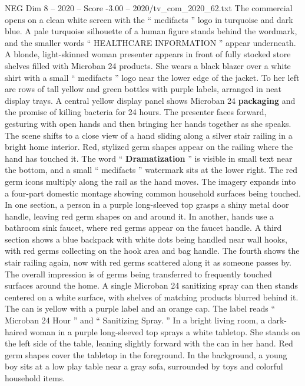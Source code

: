 \begin{textsample}{NEG Dim 8 – 2020 – Score -3.00 – 2020/tv\_com\_2020\_62.txt}  \label{ex:f8_neg_046}
The commercial opens on a clean white screen with the “ medifacts ” logo in turquoise and dark blue.
A pale turquoise silhouette of a human figure stands behind the wordmark, and the smaller words “ HEALTHCARE INFORMATION ” appear underneath.
A blonde, light-skinned woman presenter appears in front of fully stocked store shelves filled with Microban 24 products.
She wears a black blazer over a white shirt with a small “ medifacts ” logo near the lower edge of the jacket.
To her left are rows of tall yellow and green bottles with purple labels, arranged in neat display trays.
A central yellow display panel shows Microban 24 \textbf{packaging} and the promise of killing bacteria for 24 hours.
The presenter faces forward, gesturing with open hands and then bringing her hands together as she speaks.
The scene shifts to a close view of a hand sliding along a silver stair railing in a bright home interior.
Red, stylized germ shapes appear on the railing where the hand has touched it.
The word “ \textbf{Dramatization} ” is visible in small text near the bottom, and a small “ medifacts ” watermark sits at the lower right.
The red germ icons multiply along the rail as the hand moves.
The imagery expands into a four-part domestic montage showing common household surfaces being touched.
In one section, a person in a purple long-sleeved top grasps a shiny metal door handle, leaving red germ shapes on and around it.
In another, hands use a bathroom sink faucet, where red germs appear on the faucet handle.
A third section shows a blue backpack with white dots being handled near wall hooks, with red germs collecting on the hook area and bag handle.
The fourth shows the stair railing again, now with red germs scattered along it as someone passes by.
The overall impression is of germs being transferred to frequently touched surfaces around the home.
A single Microban 24 sanitizing spray can then stands centered on a white surface, with shelves of matching products blurred behind it.
The can is yellow with a purple label and an orange cap.
The label reads “ Microban 24 Hour ” and “ Sanitizing Spray. ” In a bright living room, a dark-haired woman in a purple long-sleeved top sprays a white tabletop.
She stands on the left side of the table, leaning slightly forward with the can in her hand.
Red germ shapes cover the tabletop in the foreground.
In the background, a young boy sits at a low play table near a gray sofa, surrounded by toys and colorful household items.

\end{textsample}
